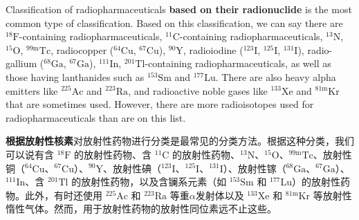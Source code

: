 \documentclass[dvipsnames, svgnames,a4paper,11pt]{article}
\begin{document}
Classification of radiopharmaceuticals \textbf{based on their radionuclide} is the most common type of classification. Based on this classification, we can say there are ${}^\text{18}\text{F}$-containing radiopharmaceuticals, ${}^\text{11}\text{C}$-containing radiopharmaceuticals, ${}^\text{13}\text{N}$, ${}^\text{15}\text{O}$, ${}^\text{99m}\text{Tc}$, radiocopper (${}^\text{64}\text{Cu}$, ${}^\text{67}\text{Cu}$), ${}^\text{90}\text{Y}$, radioiodine (${}^\text{123}\text{I}$, ${}^\text{125}\text{I}$, ${}^\text{131}\text{I}$), radio-gallium (${}^\text{68}\text{Ga}$, ${}^\text{67}\text{Ga}$), ${}^\text{111}\text{In}$, ${}^\text{201}\text{Tl}$-containing radiopharmaceuticals, as well as those having lanthanides such as ${}^\text{153}\text{Sm}$ and ${}^\text{177}\text{Lu}$. There are also heavy alpha emitters like ${}^\text{225}\text{Ac}$ and ${}^\text{223}\text{Ra}$, and radioactive noble gases like ${}^\text{133}\text{Xe}$ and ${}^\text{81m}\text{Kr}$ that are sometimes used. However, there are more radioisotopes used for radiopharmaceuticals than are on this list.

\textbf{根据放射性核素}对放射性药物进行分类是最常见的分类方法。根据这种分类，我们可以说有含 ${}^\text{18}\text{F}$ 的放射性药物、含 ${}^\text{11}\text{C}$ 的放射性药物、${}^\text{13}\text{N}$、${}^\text{15}\text{O}$、${}^\text{99m}\text{Tc}$、放射性铜（${}^\text{64}\text{Cu}$、${}^\text{67}\text{Cu}$）、${}^\text{90}\text{Y}$、放射性碘（${}^\text{123}\text{I}$、${}^\text{125}\text{I}$、${}^\text{131}\text{I}$）、放射性镓（${}^\text{68}\text{Ga}$、${}^\text{67}\text{Ga}$）、${}^\text{111}\text{In}$、含 ${}^\text{201}\text{Tl}$ 的放射性药物，以及含镧系元素（如 ${}^\text{153}\text{Sm}$ 和 ${}^\text{177}\text{Lu}$）的放射性药物。此外，有时还使用 ${}^\text{225}\text{Ac}$ 和 ${}^\text{223}\text{Ra}$ 等重$\alpha$发射体以及 ${}^\text{133}\text{Xe}$ 和 ${}^\text{81m}\text{Kr}$ 等放射性惰性气体。然而，用于放射性药物的放射性同位素远不止这些。
\end{document}
